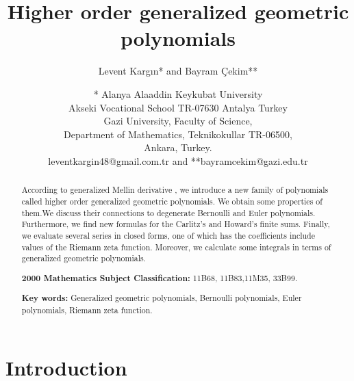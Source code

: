 \documentclass{article}%
\begin{document}
\title{Higher order generalized geometric polynomials}
\author{Levent Karg\i n* and Bayram \c{C}ekim**
\and * Alanya Alaaddin Keykubat University\\Akseki Vocational School TR-07630 Antalya Turkey\\Gazi University, Faculty of Science,\\Department of Mathematics, Teknikokullar TR-06500,\\Ankara, Turkey.\\leventkargin48@gmail.com.tr and **bayramcekim@gazi.edu.tr}
\maketitle

\begin{abstract}
According to generalized Mellin derivative \cite[Eq. (2.5)]{Kargin}, we
introduce a new family of polynomials called higher order generalized
geometric polynomials. We obtain some properties of them.We discuss their
connections to degenerate Bernoulli and Euler polynomials. Furthermore, we
find new formulas for the Carlitz's \cite[Eq. (5.4)]{Carlitz} and Howard's
\cite[Eq. (4.3)]{Howard2} finite sums. Finally, we evaluate several series in
closed forms, one of which has the coefficients include values of the Riemann
zeta function. Moreover, we calculate some integrals in terms of generalized
geometric polynomials.

\textbf{2000 Mathematics Subject Classification: }11B68, 11B83,11M35, 33B99.

\textbf{Key words: }Generalized geometric polynomials, Bernoulli polynomials,
Euler polynomials, Riemann zeta function.

\end{abstract}

\section{Introduction}
\end{document}
